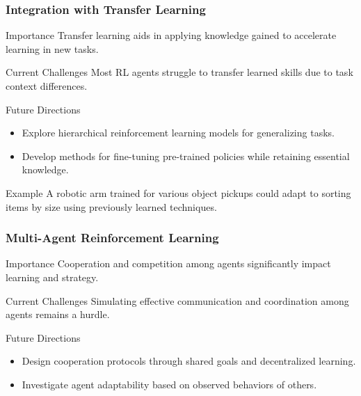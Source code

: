 \documentclass{beamer}
\begin{document}
\begin{frame}[fragile]
    \frametitle{Integration with Transfer Learning}
    \begin{block}{Importance}
        Transfer learning aids in applying knowledge gained to accelerate learning in new tasks.
    \end{block}
    \begin{block}{Current Challenges}
        Most RL agents struggle to transfer learned skills due to task context differences.
    \end{block}
    \begin{block}{Future Directions}
        \begin{itemize}
            \item Explore hierarchical reinforcement learning models for generalizing tasks.
            \item Develop methods for fine-tuning pre-trained policies while retaining essential knowledge.
        \end{itemize}
    \end{block}
    \begin{block}{Example}
        A robotic arm trained for various object pickups could adapt to sorting items by size using previously learned techniques.
    \end{block}
\end{frame}

\begin{frame}[fragile]
    \frametitle{Multi-Agent Reinforcement Learning}
    \begin{block}{Importance}
        Cooperation and competition among agents significantly impact learning and strategy.
    \end{block}
    \begin{block}{Current Challenges}
        Simulating effective communication and coordination among agents remains a hurdle.
    \end{block}
    \begin{block}{Future Directions}
        \begin{itemize}
            \item Design cooperation protocols through shared goals and decentralized learning.
            \item Investigate agent adaptability based on observed behaviors of others.
        \end{itemize}
    \end{block}
\end{frame}
\end{document}
